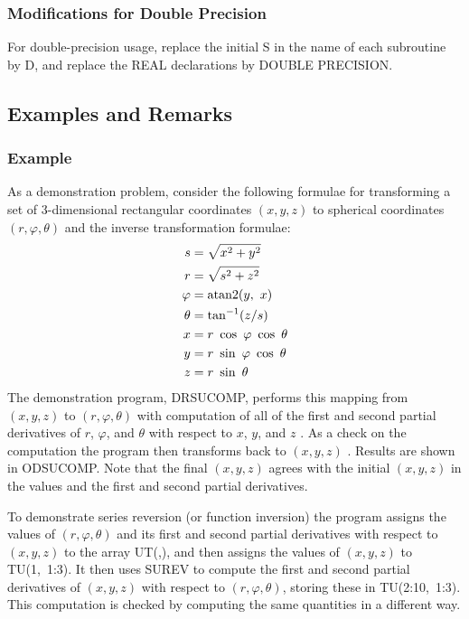 \documentclass[twoside]{MATH77}
\begin{document}
\subsubsection{Modifications for Double Precision}

For double-precision usage, replace the initial S in the name of each
subroutine by D, and replace the REAL declarations by DOUBLE PRECISION.

\subsection{Examples and Remarks}

\subsubsection{Example}

As a demonstration problem, consider the following formulae for transforming
a set of 3-dimensional rectangular coordinates $(x,y,z)$ to spherical
coordinates $(r,\varphi ,\theta )$ and the inverse transformation formulae:
\begin{align*}
s &= \sqrt{x^2 + y^2}\\
r &= \sqrt{s^2 + z^2}\\
\varphi &= \atan2(y,\ x)\\
\theta &= \tan^{-1}(z/s)\\
x &= r\ \cos \ \varphi \ \cos \ \theta \\
y &= r\ \sin \ \varphi \ \cos \ \theta \\
z &= r\ \sin \ \theta
\end{align*}
The demonstration program, DRSUCOMP, performs this mapping from $(x,y,z)$ to
$(r,\varphi ,\theta )$ with computation of all of the first and second partial
derivatives of $r$, $\varphi $, and $\theta $ with respect to $x$, $y$, and $z$%
. As a check on the computation the program then transforms back to $(x,y,z)$%
. Results are shown in ODSUCOMP. Note that the final $(x,y,z)$ agrees with
the initial $(x,y,z)$ in the values and the first and second partial
derivatives.

To demonstrate series reversion (or function inversion) the program assigns
the values of $(r,\varphi ,\theta )$ and its first and second partial
derivatives with respect to $(x,y,z)$ to the array UT(,), and then assigns the
values of $(x,y,z)$ to TU(1,~1:3). It then uses SUREV to compute the first
and second partial derivatives of $(x,y,z)$ with respect to $(r,\varphi ,\theta
)$, storing these in TU(2:10,~1:3). This computation is checked by computing
the same quantities in a different way.
\end{document}
